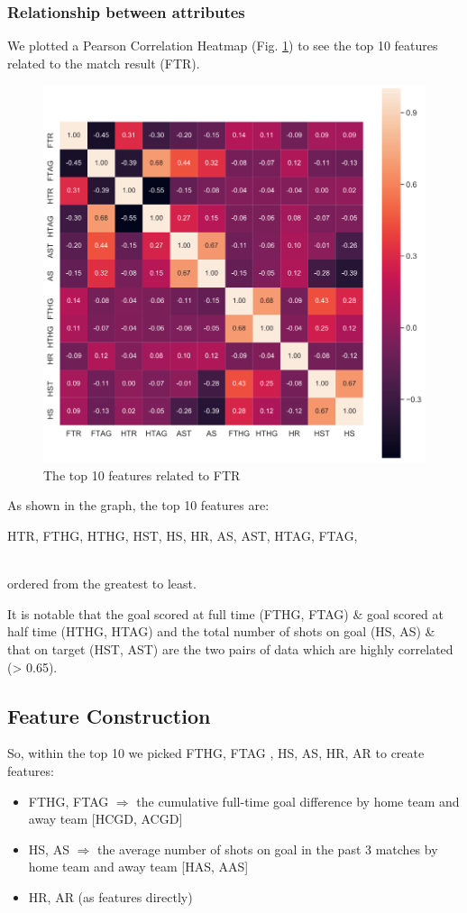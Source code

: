 \documentclass{article}
\begin{document}
\subsubsection{Relationship between attributes}
We plotted a Pearson Correlation Heatmap (Fig. \ref{fig:top-10-features-in-raw-data}) to see the top 10 features related to the match result (FTR).

\begin{figure}[ht]
\centering
\includegraphics[scale=0.3]{graphs/top-10-features-in-raw-data.png}
\caption{The top 10 features related to FTR}
\label{fig:top-10-features-in-raw-data}
\end{figure}

As shown in the graph, the top 10 features are: \\
\centerline{HTR,  FTHG, HTHG, HST, HS, HR, AS, AST, HTAG, FTAG,}	\\
ordered from the greatest to least.

It is notable that the goal scored at full time (FTHG, FTAG)  \& goal scored at half time (HTHG, HTAG) and
the total number of shots on goal (HS, AS)  \& that on target (HST, AST) are the two pairs of data which are highly correlated (> 0.65).

\subsection{Feature Construction}
So, within the top 10 we picked FTHG, FTAG , HS, AS,  HR, AR to create features:
\begin{itemize}
\item FTHG, FTAG $\Rightarrow$ the cumulative full-time goal difference by home team and away team [HCGD, ACGD]
\item HS, AS $\Rightarrow$  the average number of shots on goal in the past 3 matches by home team and away team [HAS, AAS]
\item HR, AR (as features directly) 
\end{itemize}
\end{document}
